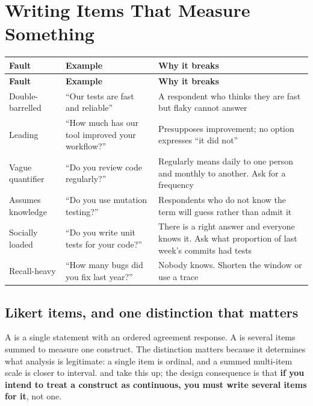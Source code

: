 \section{Writing Items That Measure Something}

\begin{center}
\small
\begin{longtable}{@{}L{2.9cm}L{4.6cm}L{6.6cm}@{}}
\toprule
\textbf{Fault} & \textbf{Example} & \textbf{Why it breaks} \\
\midrule
\endfirsthead
\toprule
\textbf{Fault} & \textbf{Example} & \textbf{Why it breaks} \\
\midrule
\endhead
\bottomrule
\endfoot
Double-barrelled
  & ``Our tests are fast and reliable''
  & A respondent who thinks they are fast but flaky cannot answer \\
Leading
  & ``How much has our tool improved your workflow?''
  & Presupposes improvement; no option expresses ``it did not'' \\
Vague quantifier
  & ``Do you review code regularly?''
  & Regularly means daily to one person and monthly to another. Ask for a
    frequency \\
Assumes knowledge
  & ``Do you use mutation testing?''
  & Respondents who do not know the term will guess rather than admit it \\
Socially loaded
  & ``Do you write unit tests for your code?''
  & There is a right answer and everyone knows it. Ask what proportion of last
    week's commits had tests \\
Recall-heavy
  & ``How many bugs did you fix last year?''
  & Nobody knows. Shorten the window or use a trace \\
\end{longtable}
\end{center}

\subsection{Likert items, and one distinction that matters}

A  is a single statement with an ordered agreement response.
A  is several items summed to measure one construct. The
distinction matters because it determines what analysis is legitimate: a single
item is ordinal, and a summed multi-item scale is closer to interval.
 and  take this up; the design consequence
is that \textbf{if you intend to treat a construct as continuous, you must
write several items for it}, not one.


